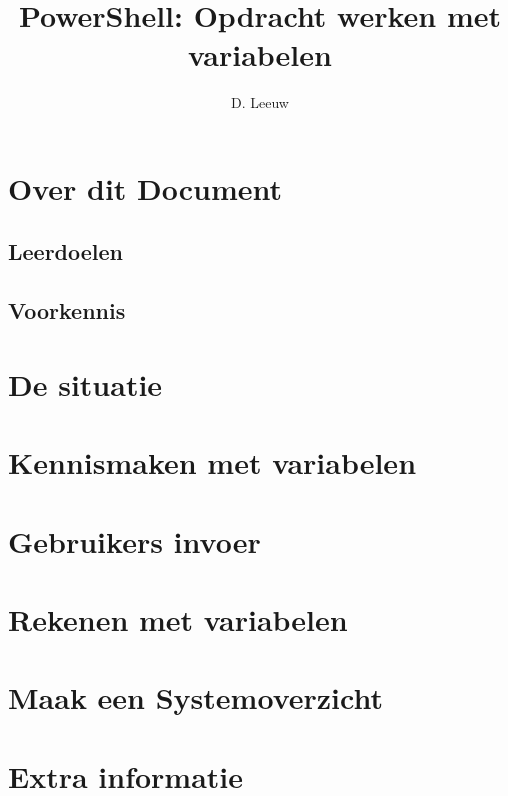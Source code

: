 \documentclass[a4paper,12pt,twoside,openright,titlepage]{article}
\author{D. Leeuw}
\title{PowerShell: Opdracht werken met variabelen}
\date{\today\\
0.0.0 \\
\vfill
\raggedright
\copyright\ 2026 Dennis Leeuw\\
}
\begin{document}

\maketitle


\section{Over dit Document}
\subsection{Leerdoelen}
\subsection{Voorkennis}


\section{De situatie}


\section{Kennismaken met variabelen}


\section{Gebruikers invoer}


\section{Rekenen met variabelen}


\section{Maak een Systemoverzicht}


\section{Extra informatie}


\printindex
\end{document}
